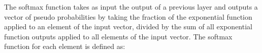 The softmax function takes as input the output of a previous layer and outputs a vector of pseudo probabilities by taking the fraction of the exponential function applied to an element of the input vector, divided by the sum of all exponential function outputs applied to all elements of the input vector.
The softmax function for each element is defined as: